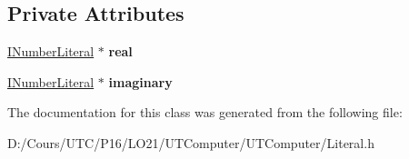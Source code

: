 \subsection*{Private Attributes}
\begin{DoxyCompactItemize}
\item 
\hyperlink{class_i_number_literal}{I\+Number\+Literal} $\ast$ {\bfseries real}\hypertarget{class_complex_literal_a6c1c1abf5cdfb4a8ab997d81c816c1db}{}\label{class_complex_literal_a6c1c1abf5cdfb4a8ab997d81c816c1db}

\item 
\hyperlink{class_i_number_literal}{I\+Number\+Literal} $\ast$ {\bfseries imaginary}\hypertarget{class_complex_literal_aebcff0eab4cea0fe08e87c8cf76ed528}{}\label{class_complex_literal_aebcff0eab4cea0fe08e87c8cf76ed528}

\end{DoxyCompactItemize}


The documentation for this class was generated from the following file\+:\begin{DoxyCompactItemize}
\item 
D\+:/\+Cours/\+U\+T\+C/\+P16/\+L\+O21/\+U\+T\+Computer/\+U\+T\+Computer/Literal.\+h\end{DoxyCompactItemize}
